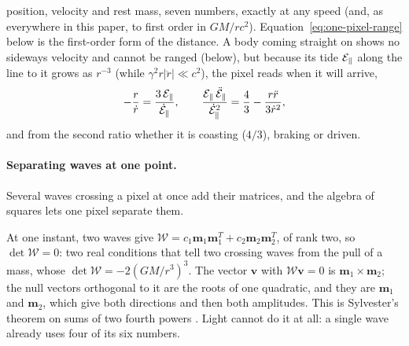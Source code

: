 position, velocity and rest mass, seven numbers, exactly at any speed (and, as
everywhere in this paper, to first order in $GM/rc^2$).
Equation~\eqref{eq:one-pixel-range}
below is the first-order form of the distance. A body coming straight on shows no sideways velocity and
cannot be ranged (below), but because its tide $\mathcal{E}_\parallel$ along the line
to it grows as
$r^{-3}$ (while $\gamma^2 r|\ddot r| \ll c^2$), the pixel reads when it will arrive,
\begin{equation}\label{eq:contact}
-\frac{r}{\dot r} = \frac{3\,\mathcal{E}_\parallel}{\dot{\mathcal{E}}_\parallel},
\qquad
\frac{\mathcal{E}_\parallel\,\ddot{\mathcal{E}}_\parallel}{\dot{\mathcal{E}}_\parallel^2} = \frac43 - \frac{r\ddot r}{3\dot r^2},
\end{equation}
and from the second ratio whether it is coasting ($4/3$), braking or driven.

\paragraph{Separating waves at one point.} Several waves crossing a pixel at
once add their matrices, and the algebra of squares lets one pixel separate
them.

At one instant, two waves give $\mathcal{W} = c_1\mathbf{m}_1\mathbf{m}_1^{T} +
c_2\mathbf{m}_2\mathbf{m}_2^{T}$, of rank two, so $\det\mathcal{W} = 0$: two real
conditions that tell two crossing waves from the pull of a mass, whose
$\det\mathcal{W} = -2(GM/r^3)^3$. The vector $\mathbf{v}$ with $\mathcal{W}\mathbf{v} = 0$ is
$\mathbf{m}_1\times\mathbf{m}_2$; the null vectors orthogonal to it are the
roots of one quadratic, and they are $\mathbf{m}_1$ and $\mathbf{m}_2$, which give
both directions and then both amplitudes. This is Sylvester's theorem on sums of
two fourth powers \cite{Sylvester1851}. Light cannot
do it at all: a single wave already uses four of its six numbers.

